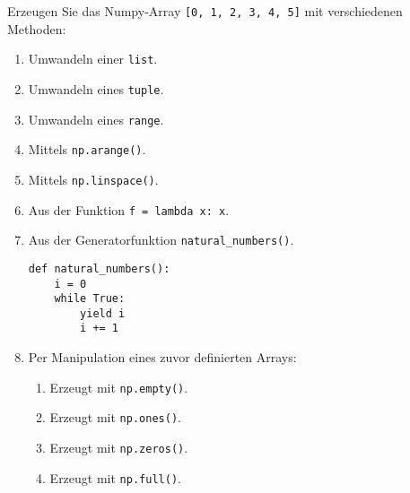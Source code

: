 Erzeugen Sie das Numpy-Array \lstinline![0, 1, 2, 3, 4, 5]! mit verschiedenen
Methoden:

\begin{enumerate}
	\item Umwandeln einer \lstinline!list!.
	\item Umwandeln eines \lstinline!tuple!.
	\item Umwandeln eines \lstinline!range!.
	\item Mittels \lstinline!np.arange()!.
	\item Mittels \lstinline!np.linspace()!.
	\item Aus der Funktion \lstinline!f = lambda x: x!.
	\item Aus der Generatorfunktion \lstinline!natural_numbers()!.
	\begin{lstlisting}
def natural_numbers():
    i = 0
    while True:
        yield i
        i += 1
	\end{lstlisting}
	\item Per Manipulation eines zuvor definierten Arrays:
	\begin{enumerate}
		\item Erzeugt mit \lstinline!np.empty()!.
		\item Erzeugt mit \lstinline!np.ones()!.
		\item Erzeugt mit \lstinline!np.zeros()!.
		\item Erzeugt mit \lstinline!np.full()!.
	\end{enumerate}
\end{enumerate}
